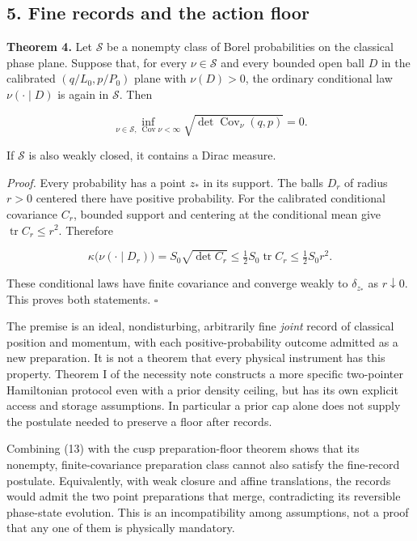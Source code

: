 \documentclass[11pt,a4paper]{article}
\begin{document}
\hypertarget{fine-records-and-the-action-floor}{%
\subsection{5. Fine records and the action
floor}\label{fine-records-and-the-action-floor}}

\textbf{Theorem 4.} Let \(\mathcal S\) be a nonempty class of Borel
probabilities on the classical phase plane. Suppose that, for every
\(\nu\in\mathcal S\) and every bounded open ball \(D\) in the calibrated
\((q/L_0,p/P_0)\) plane with \(\nu(D)>0\), the ordinary conditional law
\(\nu(\cdot\mid D)\) is again in \(\mathcal S\). Then

\[
 \inf_{\nu\in\mathcal S,\ \operatorname{Cov}\nu<\infty}
 \sqrt{\det\operatorname{Cov}_\nu(q,p)}=0. \tag{13}
\]

If \(\mathcal S\) is also weakly closed, it contains a Dirac measure.

\emph{Proof.} Every probability has a point \(z_*\) in its support. The
balls \(D_r\) of radius \(r>0\) centered there have positive
probability. For the calibrated conditional covariance \(C_r\), bounded
support and centering at the conditional mean give
\(\operatorname{tr} C_r\le r^2\). Therefore

\[
 \kappa\bigl(\nu(\cdot\mid D_r)\bigr)
 =S_0\sqrt{\det C_r}\le\tfrac12 S_0\operatorname{tr}C_r
 \le\tfrac12S_0r^2. \tag{14}
\]

These conditional laws have finite covariance and converge weakly to
\(\delta_{z_*}\) as \(r\downarrow0\). This proves both statements.
\(\square\)

The premise is an ideal, nondisturbing, arbitrarily fine \emph{joint}
record of classical position and momentum, with each
positive-probability outcome admitted as a new preparation. It is not a
theorem that every physical instrument has this property. Theorem I of
the necessity note constructs a more specific two-pointer Hamiltonian
protocol even with a prior density ceiling, but has its own explicit
access and storage assumptions. In particular a prior cap alone does not
supply the postulate needed to preserve a floor after records.

Combining (13) with the cusp preparation-floor theorem shows that its
nonempty, finite-covariance preparation class cannot also satisfy the
fine-record postulate. Equivalently, with weak closure and affine
translations, the records would admit the two point preparations that
merge, contradicting its reversible phase-state evolution. This is an
incompatibility among assumptions, not a proof that any one of them is
physically mandatory.
\end{document}
